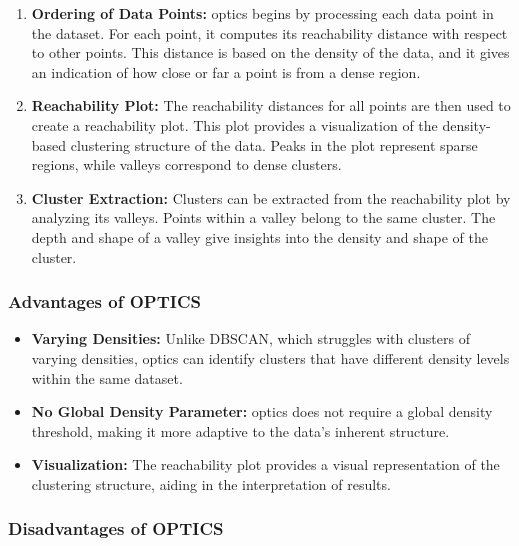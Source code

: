         \begin{enumerate}
            \item \textbf{Ordering of Data Points:} \acrshort{optics} begins by processing each data point in the dataset. For each point, it computes its reachability distance with respect to other points. This distance is based on the density of the data, and it gives an indication of how close or far a point is from a dense region.
            
            \item \textbf{Reachability Plot:} The reachability distances for all points are then used to create a reachability plot. This plot provides a visualization of the density-based clustering structure of the data. Peaks in the plot represent sparse regions, while valleys correspond to dense clusters.
            
            \item \textbf{Cluster Extraction:} Clusters can be extracted from the reachability plot by analyzing its valleys. Points within a valley belong to the same cluster. The depth and shape of a valley give insights into the density and shape of the cluster.
        \end{enumerate}
        
        \subsubsection{Advantages of OPTICS}
        
        \begin{itemize}
            \item \textbf{Varying Densities:} Unlike DBSCAN, which struggles with clusters of varying densities, \acrshort{optics} can identify clusters that have different density levels within the same dataset.
            
            \item \textbf{No Global Density Parameter:} \acrshort{optics} does not require a global density threshold, making it more adaptive to the data's inherent structure.
            
            \item \textbf{Visualization:} The reachability plot provides a visual representation of the clustering structure, aiding in the interpretation of results.
        \end{itemize}
        
        \subsubsection{Disadvantages of OPTICS}
        
